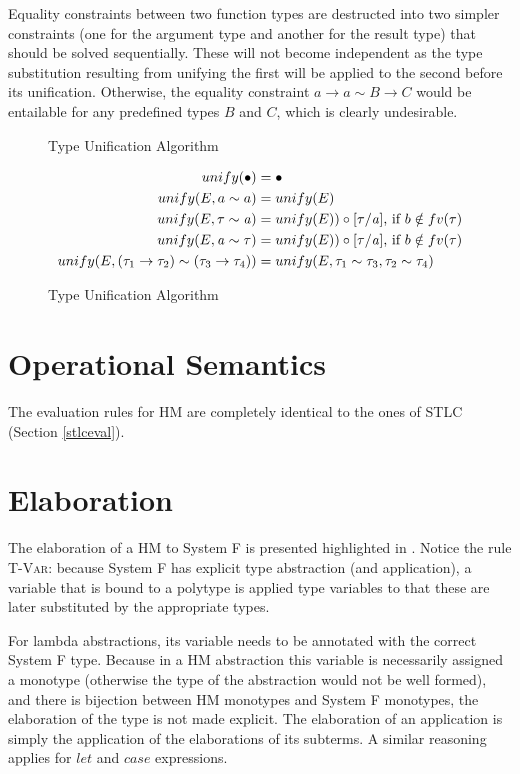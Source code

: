 Equality constraints between two function types are destructed into two simpler constraints (one for the argument type and another for the result type) that should be solved sequentially. These will not become independent as the type substitution resulting from unifying the first will be applied to the second before its unification. Otherwise, the equality constraint $a\to a \sim B \to C$ would be entailable for any predefined types $B$ and $C$, which is clearly undesirable.
\begin{figure}
  \begin{flushleft}  

                {Type Unification Algorithm}
\end{flushleft}
  \begin{align}
  unify(\bullet)&=\bullet\\
  unify(E, a \sim a) &= unify(E)           \\
  unify(E, \mathit{\tau} \sim \mathit{a})&= unify(E)) \circ [\mathit{\tau}/\mathit{a}]\text{, if $b \notin fv(\mathit{\tau})$}\\
  unify(E, \mathit{a} \sim \mathit{\tau}) &= unify(E)) \circ [\mathit{\tau}/\mathit{a}]\text{, if $b \notin fv(\mathit{\tau})$}\\
  unify(E, (\mathit{\tau}_1 \to \mathit{\tau}_2) \sim (\mathit{\tau}_3 \to \mathit{\tau}_4)) &= unify(E,\mathit{\tau}_1 \sim \mathit{\tau}_3,\mathit{\tau}_2 \sim \mathit{\tau}_4)
  \end{align}
  \caption{Type Unification Algorithm}
  \label{unification}
\end{figure}
\section{Operational Semantics}
\label{3op}
The evaluation rules for HM are completely identical to the ones of STLC (Section \ref{stlceval}).
\section{Elaboration}
\label{3elab}
The elaboration of a HM to System F is presented highlighted in . Notice the rule \textsc{T-Var}: because System F has explicit type abstraction (and application), a variable that is bound to a polytype is applied type variables to that these are later substituted by the appropriate types.

For lambda abstractions, its variable needs to be annotated with the correct System F type. Because in a HM abstraction this variable is necessarily assigned a monotype (otherwise the type of the abstraction would not be well formed), and there is bijection between HM monotypes and System F monotypes, the elaboration of the type is not made explicit. The elaboration of an application is simply the application of the elaborations of its subterms. A similar reasoning applies for $let$ and $case$ expressions.

